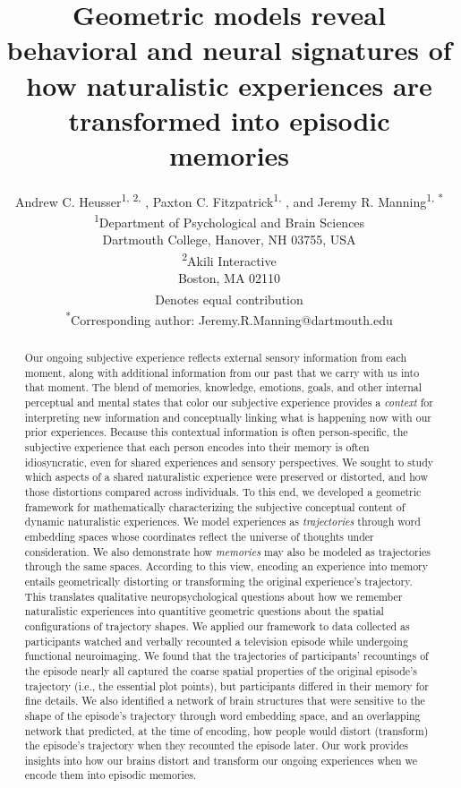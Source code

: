 \documentclass{article}
\title{Geometric models reveal behavioral and neural signatures of how naturalistic experiences are transformed into episodic memories}
\author{Andrew C. Heusser\textsuperscript{1, 2, \textdagger}, Paxton C. Fitzpatrick\textsuperscript{1, \textdagger}, and Jeremy R. Manning\textsuperscript{1, *}\\\textsuperscript{1}Department of Psychological and Brain Sciences\\Dartmouth College, Hanover, NH 03755, USA\\\textsuperscript{2}Akili Interactive\\Boston, MA 02110\\\textsuperscript{\textdagger}Denotes equal contribution\\\textsuperscript{*}Corresponding author: Jeremy.R.Manning@dartmouth.edu}
\begin{document}
\maketitle

\begin{abstract}
Our ongoing subjective experience reflects external sensory information from each moment, along with additional information from our past that we carry with us into that moment.  The blend of memories, knowledge, emotions, goals, and other internal perceptual and mental states that color our subjective experience provides a \textit{context} for interpreting new information and conceptually linking what is happening now with our prior experiences.  Because this contextual information is often person-specific, the subjective experience that each person encodes into their memory is often idiosyncratic, even for shared experiences and sensory perspectives.  We sought to study which aspects of a shared naturalistic experience were preserved or distorted, and how those distortions compared across individuals.  To this end, we developed a geometric framework for mathematically characterizing the subjective conceptual content of dynamic naturalistic experiences.  We model experiences as \textit{trajectories} through word embedding spaces whose coordinates reflect the universe of thoughts under consideration.  We also demonstrate how \textit{memories} may also be modeled as trajectories through the same spaces.  According to this view, encoding an experience into memory entails geometrically distorting or transforming the original experience's trajectory.  This translates qualitative neuropsychological questions about how we remember naturalistic experiences into quantitive geometric questions about the spatial configurations of trajectory shapes.  We applied our framework to data collected as participants watched and verbally recounted a television episode while undergoing functional neuroimaging.  We found that the trajectories of participants' recountings of the episode nearly all captured the coarse spatial properties of the original episode's trajectory (i.e., the essential plot points), but participants differed in their memory for fine details.  We also identified a network of brain structures that were sensitive to the shape of the episode's trajectory through word embedding space, and an overlapping network that predicted, at the time of encoding, how people would distort (transform) the episode's trajectory when they recounted the episode later.  Our work provides insights into how our brains distort and transform our ongoing experiences when we encode them into episodic memories.
\end{abstract}
\end{document}
